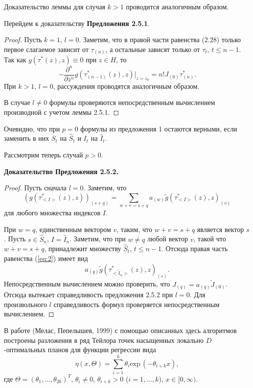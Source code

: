                 Доказательство леммы для случая $k>1$ проводится аналогичным
                образом.

                Перейдем к доказательству \textbf{ Предложения 2.5.1}.
                \begin{proof} Пусть $k=1$,
                $l=0$. Заметим, что в правой части равенства (2.28) только первое
                слагаемое зависит от $\tau_{(n)}$, а остальные зависят только от
                $\tau_t$, $t\leq n-1$. Так как $g(\tau^*(z),z)\equiv 0$ при $z\in
                H$, то
                $$
                -\frac{\partial^n}{\partial z^n} g\left(\tau^*_{(n-1)}(z),
                        z\right)|_{z=z_0}= n! J_{(0)}\tau^*_{(n)}.
                $$
                При $k>1$, $l=0$, рассуждения проводятся аналогичным образом.

                В случае $l\ne 0$ формулы проверяются непосредственным вычислением
                производной с учетом леммы 2.5.1.
                \end{proof}
                Очевидно, что при $p=0$ формулы из предложения 1 остаются верными,
                если заменить в них $S_t$ на $\hat S_t$ и $I_t$ на $\hat I_t$.

                Рассмотрим теперь случай $p>0$.

                \textbf{ Доказательство Предложения 2.5.2.} \begin{proof}
                Пусть сначала $l=0$.
                Заметим, что \begin{equation} \left(g(\tau^*_{<I>}(z),z)\right)_{(s+q)}=
                \sum_{w+v=s+q}a_{(w)}\tilde g(\tau^*_{<I>}(z),z)_{(v)} \label{eq:2}
                \end{equation} для любого множества индексов $I$.

                При $w=q$, единственным вектором $v$, таким, что $w+v=s+q$ является
                вектор $s$. Пусть $s \in \hat S_n$, $I= \hat I_{n}$. Заметим, что
                при $w\ne q$ любой вектор $v$, такой что $w+v=s+q$, принадлежит
                множеству $\hat S_t$, $t\leq n-1$. Отсюда правая часть равенства
                (\ref{eq:2}) имеет вид
                $$
                a_{(q)}\tilde g\left(\tau^*_{<\tilde I_n>}(z),z\right)_{(s)}.
                $$
                Непосредственным вычислением можно проверить, что $J_{(q)}=a_{(q)}
                \tilde J_{(0)}$. Отсюда вытекает справедливость предложения 2.5.2
                при $l=0$. Для произвольного $l$ справедливость формул проверяется
                непосредственным вычислением.\end{proof}

                В работе (Мелас, Пепелышев, 1999) с помощью описанных здесь
                алгоритмов построены разложения в ряд Тейлора точек насыщенных
                локально $D$-оптимальных планов для функции регрессии вида
                $$
                \eta(x,\Theta)=\sum^k_{i=1}\theta_i {\mbox{exp}}\,(-\theta_{i+k}x),
                $$
                где $\Theta=(\theta_1,\ldots,\theta_{2k})^T$, $\theta_i\ne 0$,
                $\theta_{i+k}>0$ ($i=1,\ldots,k$), $x\in [0,\infty)$.


